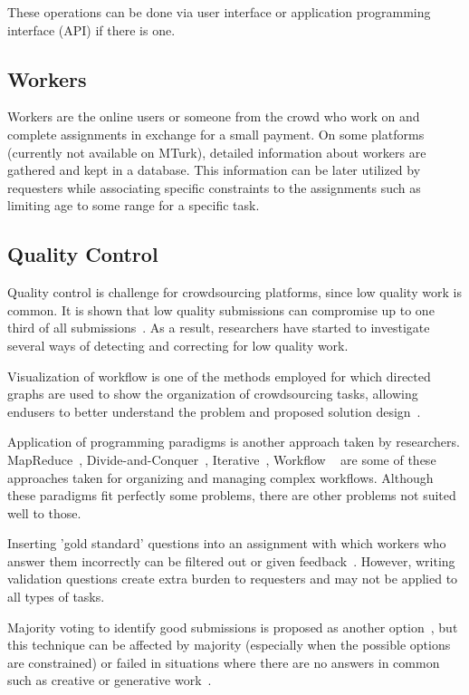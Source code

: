 These operations can be done via user interface or application programming 
interface (API) if there is one. 

\subsection{Workers}
Workers are the online users or someone from the crowd who work on and 
complete assignments in exchange for a small payment. On some platforms 
(currently not available on MTurk), detailed information about workers are gathered 
and kept in a database. This information can be later utilized by requesters while 
associating specific constraints to the assignments such as limiting age to some 
range for a specific task. 

\subsection{Quality Control}
Quality control is challenge for crowdsourcing platforms, since low quality work 
is common. It is shown that low quality submissions can compromise up to one third 
of all submissions~\cite{Bernstein2010}. As a result, researchers have started to 
investigate several ways of detecting and correcting for low quality work.

Visualization of workflow is one of the methods employed for which directed graphs 
are used to show the organization of crowdsourcing tasks, allowing endusers 
to better understand the problem and proposed solution design~\cite{Kulkarni2012, Kittur2012}.

Application of programming paradigms is another approach taken by 
researchers. MapReduce~\cite{Kittur2011, Ahmad2011}, 
Divide-and-Conquer~\cite{Kulkarni2012}, 
Iterative~\cite{Little2009}, 
Workflow ~\cite{Kokciyan2012} are some of these approaches taken for 
organizing and managing complex workflows. Although these paradigms 
fit perfectly some problems, there are other problems not suited well to those.

Inserting 'gold standard' questions into an assignment with which workers 
who answer them incorrectly can be filtered out or given feedback~\cite{Burch2009}. 
However, writing validation questions create extra burden to requesters and 
may not be applied to all types of tasks.

Majority voting to identify good submissions is proposed as another 
option~\cite{Burch2009, Bernstein2010}, but this technique can be affected 
by majority (especially when the possible options are constrained) or failed in 
situations where there are no answers in common such as creative or generative 
work~\cite{Rzeszotarski2012}.

